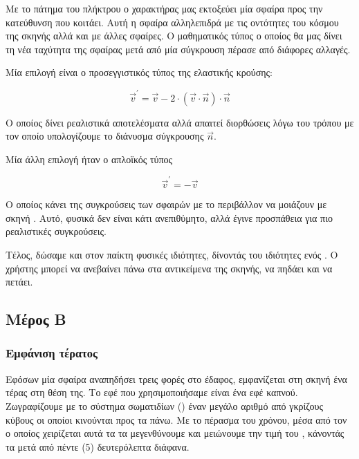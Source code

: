 \documentclass[11pt]{scrartcl} %
\begin{document}
Με το πάτημα του πλήκτρου  ο χαρακτήρας μας εκτοξεύει μία σφαίρα προς την κατεύθυνση που κοιτάει. Αυτή η σφαίρα
αλληλεπιδρά με τις οντότητες του κόσμου της σκηνής αλλά και με άλλες σφαίρες. Ο μαθηματικός τύπος
ο οποίος θα μας δίνει τη νέα ταχύτητα της σφαίρας μετά από μία σύγκρουση πέρασε από διάφορες αλλαγές. 

Μία επιλογή είναι ο προσεγγιστικός τύπος της ελαστικής κρούσης:

\begin{equation}
    \vec{v}^\prime = \vec{v} - 2 \cdot ( \vec{v} \cdot \vec{n} ) \cdot \vec{n}
\end{equation}

Ο οποίος δίνει ρεαλιστικά αποτελέσματα αλλά απαιτεί διορθώσεις λόγω του τρόπου με τον οποίο υπολογίζουμε το διάνυσμα 
σύγκρουσης $\vec{n}$. 

Μία άλλη επιλογή ήταν ο απλοϊκός τύπος 

\begin{equation}
    \vec{v}^\prime = -\vec{v}
\end{equation}

Ο οποίος κάνει της συγκρούσεις των σφαιρών με το περιβάλλον να μοιάζουν με σκηνή . Αυτό, φυσικά 
δεν είναι κάτι ανεπιθύμητο, αλλά έγινε προσπάθεια για πιο ρεαλιστικές συγκρούσεις.

Τέλος, δώσαμε και στον παίκτη φυσικές ιδιότητες, δίνοντάς του ιδιότητες ενός . 
Ο χρήστης μπορεί να ανεβαίνει πάνω στα αντικείμενα της σκηνής, να πηδάει και να πετάει.


\subsection{Μέρος Β}

\subsubsection{Εμφάνιση τέρατος}

Εφόσων μία σφαίρα αναπηδήσει τρεις φορές στο έδαφος, εμφανίζεται στη σκηνή ένα τέρας στη θέση της. Το εφέ που 
χρησιμοποιήσαμε είναι ένα εφέ καπνού. Ζωγραφίζουμε με το σύστημα σωματιδίων () 
έναν μεγάλο αριθμό από γκρίζους κύβους οι οποίοι κινούνται προς τα πάνω. 
Με το πέρασμα του χρόνου, μέσα από τον  ο οποίος χειρίζεται αυτά τα  τα μεγενθύνουμε
και μειώνουμε την τιμή του , κάνοντάς τα μετά από πέντε (5) δευτερόλεπτα διάφανα. 
\end{document}
